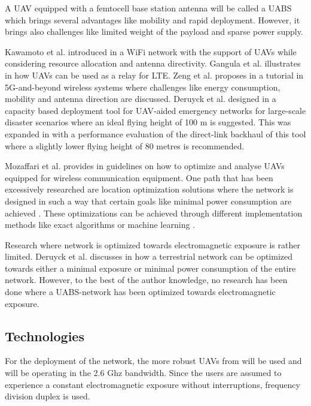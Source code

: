 \documentclass[twocolumn]{phdsymp} %
\begin{document}
A \gls{UAV} equipped with a femtocell base station antenna will be called a \gls{UABS}
which brings several advantages like mobility and rapid deployment. 
However, it brings also challenges like limited weight of the payload and sparse power supply.

Kawamoto et al. introduced in \cite{U11} a WiFi network with the support of  \gls{UAV}s while considering resource allocation 
and antenna directivity. 
Gangula et al. illustrates in \cite{U10} how \gls{UAV}s can be used as a relay for LTE. 
Zeng et al. proposes in  \cite{U12} a tutorial in 5G-and-beyond wireless systems where challenges like 
energy consumption, mobility and antenna direction are discussed. 
Deruyck et al. designed in \cite{J2} a capacity based deployment tool for UAV-aided emergency
networks for large-scale disaster scenarios where an ideal flying height of 100 m is suggested. This was expanded 
in \cite{U1} with a performance evaluation of the direct-link backhaul of this tool where a slightly lower 
flying height of 80 metres is recommended.


Mozaffari et al. provides in \cite{U3} guidelines on how to optimize and analyse \gls{UAV}s equipped for 
wireless communication equipment.
One path that has been excessively researched are location optimization solutions where the network is 
designed in such a way that certain goals like minimal power consumption are achieved \cite{U6,U7,U8,U9}.
These optimizations can be achieved through different implementation methods like exact algorithms or machine learning \cite{U3,U5}.

Research where network is optimized towards electromagnetic exposure is rather limited.
Deruyck et al. discusses in \cite{J1} how a terrestrial network can be optimized towards either a minimal exposure or minimal power consumption of the entire network.
However, to the best of the author knowledge, no research has been done where a \gls{UABS}-network has been optimized towards electromagnetic exposure.

\subsection{Technologies}

For the deployment of the network, the more robust \gls{UAV}s from \cite{J2} will be used and will be operating in the 2.6 Ghz 
bandwidth. Since the users are assumed to experience a constant electromagnetic exposure without interruptions, frequency division duplex is used.
\end{document}

